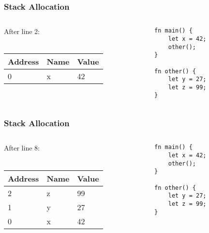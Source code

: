 \documentclass{beamer}
\begin{document}
\begin{frame}[fragile]
	\frametitle{Stack Allocation}
	\begin{columns}[T, c]
		\begin{column}{0.48\textwidth}
			After line 2: \\~\\
			\begin{tabular}{| l | l | l |}
				\hline
				Address & Name & Value \\ \hline
				0 & x & 42 \\ \hline
			\end{tabular}
		\end{column}
		\begin{column}{0.48\textwidth}
			\begin{verbatim}
fn main() {
    let x = 42;
    other();
}

fn other() {
	let y = 27;
	let z = 99;
}
			\end{verbatim}
		\end{column}
	\end{columns}
\end{frame}
\begin{frame}[fragile]
	\frametitle{Stack Allocation}
	\begin{columns}[T, c]
		\begin{column}{0.48\textwidth}
			After line 8: \\~\\
			\begin{tabular}{| l | l | l |}
				\hline
				Address & Name & Value \\ \hline
				2 & z & 99 \\ \hline
				1 & y & 27 \\ \hline
				0 & x & 42 \\ \hline
			\end{tabular}
		\end{column}
		\begin{column}{0.48\textwidth}
			\begin{verbatim}
fn main() {
	let x = 42;
	other();
}

fn other() {
	let y = 27;
	let z = 99;
}
			\end{verbatim}
		\end{column}
	\end{columns}
\end{frame}
\end{document}
